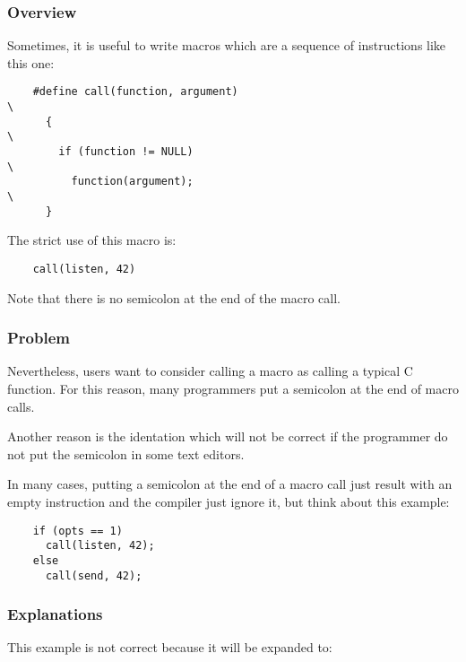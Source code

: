 {%

\begin{frame}[containsverbatim]
  \frametitle{Overview}

  Sometimes, it is useful to write macros which are a sequence of
  instructions like this one:

  \begin{verbatim}
    #define call(function, argument)                                    \
      {                                                                 \
        if (function != NULL)                                           \
          function(argument);                                           \
      }
  \end{verbatim}

  The strict use of this macro is:

  \begin{verbatim}
    call(listen, 42)
  \end{verbatim}

  Note that there is no semicolon at the end of the macro call.
\end{frame}


\begin{frame}[containsverbatim]
  \frametitle{Problem}

  Nevertheless, users want to consider calling a macro as calling a
  typical C function. For this reason, many programmers put a semicolon
  at the end of macro calls.

  \nl

  Another reason is the identation which will not be correct if the
  programmer do not put the semicolon in some text editors.

  \nl

  In many cases, putting a semicolon at the end of a macro call
  just result with an empty instruction and the compiler just ignore it,
  but think about this example:

  \begin{verbatim}
    if (opts == 1)
      call(listen, 42);
    else
      call(send, 42);
  \end{verbatim}
\end{frame}


\begin{frame}[containsverbatim]
  \frametitle{Explanations}

  This example is \alert{not} correct because it will be expanded to:


\end{frame}}
